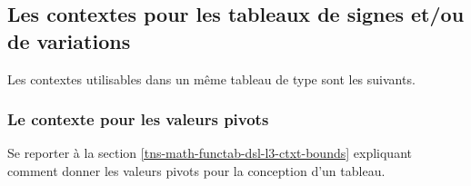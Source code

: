 \documentclass[10pt, a4paper]{article}
\begin{document}

\subsection{Les contextes pour les tableaux de signes et/ou de variations}

Les contextes utilisables dans un même tableau de type  sont les suivants.

\medskip

\begin{itemize*}[before = \leavevmode\kern15pt, itemjoin = \kern15pt]
	\item {}

	\item {}

	\item {}
\end{itemize*}




\subsubsection{Le contexte  pour les valeurs pivots}

Se reporter à la section \ref{tns-math-functab-dsl-l3-ctxt-bounds} expliquant comment donner les valeurs pivots pour la conception d'un tableau.
\end{document}
